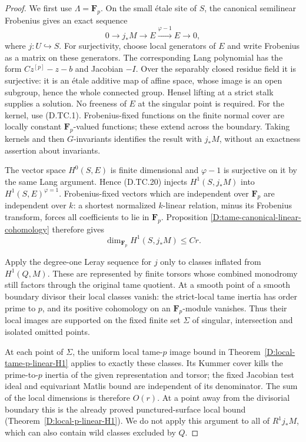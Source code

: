 \begin{proof}
We first use $\Lambda=\mathbf F_p$.  On the small
\'etale site of $S$, the canonical semilinear Frobenius
gives an exact sequence
\[
          0\longrightarrow j_*M\longrightarrow E
                   \xrightarrow{\varphi-1}E
                   \longrightarrow0,                  \tag{D.TC.20}
\]
where $j:U\hookrightarrow S$.
For surjectivity, choose local generators of $E$ and
write Frobenius as a matrix on these generators.
The corresponding Lang polynomial has the form
$Cz^{[p]}-z-b$ and Jacobian $-I$.  Over the separably
closed residue field it is surjective: it is an
\'etale additive map of affine space, whose image is
an open subgroup, hence the whole connected group.
Hensel lifting at a strict stalk supplies a solution.
No freeness of $E$ at the singular point is required.
For the kernel, use (D.TC.1).  Frobenius-fixed functions
on the finite normal cover are locally constant
$\mathbf F_p$-valued functions; these extend across
the boundary.  Taking kernels and then $G$-invariants
identifies the result with $j_*M$, without an
exactness assertion about invariants.

The vector space $H^0(S,E)$ is finite dimensional and
$\varphi-1$ is surjective on it by the same Lang argument.
Hence (D.TC.20) injects $H^1(S,j_*M)$ into
$H^1(S,E)^{\varphi=1}$.  Frobenius-fixed vectors which
are independent over $\mathbf F_p$ are independent
over $k$: a shortest normalized $k$-linear relation,
minus its Frobenius transform, forces all coefficients
to lie in $\mathbf F_p$.  Proposition
\ref{D:tame-canonical-linear-cohomology} therefore gives
\[
                      \dim_{\mathbf F_p}H^1(S,j_*M)\le Cr.
                                                        \tag{D.TC.21}
\]

Apply the degree-one Leray sequence for $j$ only to
classes inflated from $H^1(Q,M)$.  These are represented
by finite torsors whose combined monodromy still factors
through the original tame quotient.  At a smooth point
of a smooth boundary divisor their local classes vanish:
the strict-local tame inertia has order prime to $p$,
and its positive cohomology on an $\mathbf F_p$-module
vanishes.  Thus their local images are supported on the
fixed finite set $\Sigma$ of singular, intersection and
isolated omitted points.

At each point of $\Sigma$, the uniform local tame-$p$
image bound in Theorem~\ref{D:local-tame-p-linear-H1}
applies to exactly these classes.  Its
Kummer cover kills the prime-to-$p$ inertia of the
given representation and torsor; the fixed Jacobian
test ideal and equivariant Matlis bound are independent
of its denominator.  The sum of the local dimensions
is therefore $O(r)$.  At a point away from the
divisorial boundary this is the already proved
punctured-surface local bound
(Theorem~\ref{D:local-p-linear-H1}).  We do not apply this
argument to all of $R^1j_*M$, which can also contain
wild classes excluded by $Q$.


\end{proof}

